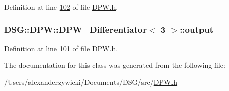 Definition at line \hyperlink{_d_p_w_8h_source_l00102}{102} of file \hyperlink{_d_p_w_8h_source}{D\+P\+W.\+h}.

\hypertarget{class_d_s_g_1_1_d_p_w_1_1_d_p_w___differentiator_3_013_01_4_a09eeb701309aa1f1034964921417a904}{
\subsubsection[{output}]{ {\bf D\+S\+G\+::\+D\+P\+W\+::\+D\+P\+W\+\_\+\+Differentiator}$<$ 3 $>$\+::output\hspace{0.3cm}{\ttfamily [protected]}}}\label{class_d_s_g_1_1_d_p_w_1_1_d_p_w___differentiator_3_013_01_4_a09eeb701309aa1f1034964921417a904}


Definition at line \hyperlink{_d_p_w_8h_source_l00101}{101} of file \hyperlink{_d_p_w_8h_source}{D\+P\+W.\+h}.



The documentation for this class was generated from the following file\+:\begin{DoxyCompactItemize}
\item 
/\+Users/alexanderzywicki/\+Documents/\+D\+S\+G/src/\hyperlink{_d_p_w_8h}{D\+P\+W.\+h}\end{DoxyCompactItemize}
